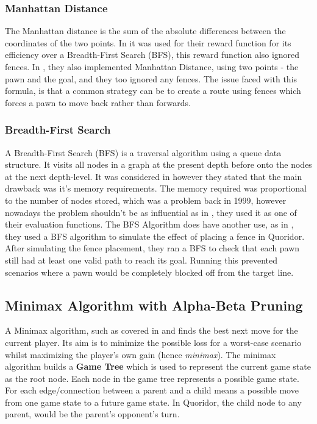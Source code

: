 \documentclass[review]{cmpreport}
\begin{document}
\subsubsection{Manhattan Distance}
The Manhattan distance is the sum of the absolute differences between the coordinates of the two points. In \cite{josequoridor} it was used for their reward function for its efficiency over a Breadth-First Search (BFS), this reward function also ignored fences. In \cite{glendenning2005mastering}, they also implemented Manhattan Distance, using two points - the pawn and the goal, and they too ignored any fences. The issue faced with this formula, is that a common strategy can be to create a route using fences which forces a pawn to move back rather than forwards.

\subsubsection{Breadth-First Search}
A Breadth-First Search (BFS) is a traversal algorithm using a queue data structure. It visits all nodes in a graph at the present depth before onto the nodes at the next depth-level. It was considered in \cite{korf1999artificial} however they stated that the main drawback was it's memory requirements. The memory required was proportional to the number of nodes stored, which was a problem back in 1999, however nowadays the problem shouldn't be as influential as in \cite{josequoridor}, they used it as one of their evaluation functions. The BFS Algorithm does have another use, as in \cite{respall2018monte}, they used a BFS algorithm to simulate the effect of placing a fence in Quoridor. After simulating the fence placement, they ran a BFS to check that each pawn still had at least one valid path to reach its goal. Running this prevented scenarios where a pawn would be completely blocked off from the target line.

\subsection{Minimax Algorithm with Alpha-Beta Pruning}
A Minimax algorithm, such as covered in \cite{plaat1996best} and \cite{strong2011minimax} finds the best next move for the current player. Its aim is to minimize the possible loss for a worst-case scenario whilst maximizing the player's own gain (hence \textit{minimax}). The minimax algorithm builds a \textbf{Game Tree} which is used to represent the current game state as the root node. Each node in the game tree represents a possible game state. For each edge/connection between a parent and a child means a possible move from one game state to a future game state. In Quoridor, the child node to any parent, would be the parent's opponent's turn.\newline
\end{document}
